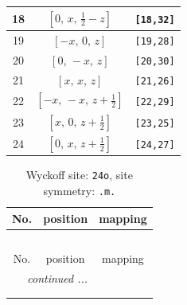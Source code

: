 \documentclass[fleqn,8pt]{jsarticle}
\begin{document}
\begin{longtable}{ccc}
18 & $\left[ 0,\, x,\, \frac{1}{2} - z \right]$ & {\tt [18,32]} \\ \hline
19 & $\left[ - x,\, 0,\, z \right]$ & {\tt [19,28]} \\ \hline
20 & $\left[ 0,\, - x,\, z \right]$ & {\tt [20,30]} \\ \hline
21 & $\left[ x,\, x,\, z \right]$ & {\tt [21,26]} \\ \hline
22 & $\left[ - x,\, - x,\, z + \frac{1}{2} \right]$ & {\tt [22,29]} \\ \hline
23 & $\left[ x,\, 0,\, z + \frac{1}{2} \right]$ & {\tt [23,25]} \\ \hline
24 & $\left[ 0,\, x,\, z + \frac{1}{2} \right]$ & {\tt [24,27]} \\
\end{longtable}
\renewcommand{\arraystretch}{1.2}
\begin{longtable}{ccc}
\caption{Wyckoff site: {\tt 24o}, site symmetry: {\tt .m.}}
 \\
 \hline \hline
No. & position & mapping \\ \hline \endfirsthead

\multicolumn{2}{l}{\tablename\ \thetable{}} \\
 \hline \hline
No. & position & mapping \\ \hline \endhead

 \hline \hline
\multicolumn{2}{r}{\footnotesize\it continued ...} \\ \endfoot

 \hline \hline
\multicolumn{2}{r}{} \\ \endlastfoot


\end{longtable}
\end{document}
